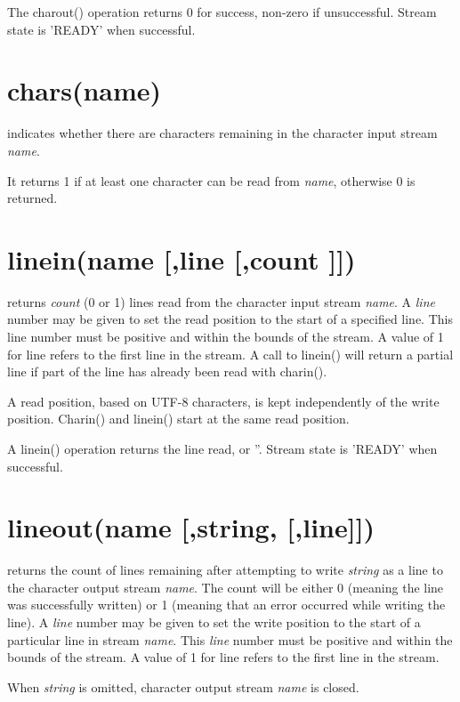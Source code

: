 The charout() operation returns 0 for success, non-zero if unsuccessful. Stream state is 'READY' when successful.

\section{chars(name)}
indicates whether there are characters remaining in the character input stream
\emph{name}.

It returns 1 if at least one character can be read from \emph{name},
otherwise 0 is returned.

\section{linein(name [,line [,count {]}{]})}
returns \emph{count} (0 or 1) lines read from the character input stream \emph{name}.
A \emph{line} number may be given to set the read position to the start of a specified line. This
line number must be positive and within the bounds of the stream. A value of 1 for line refers
to the first line in the stream. A call to linein() will return a partial line
if part of the line has already been read with charin().

A read position, based on UTF-8 characters, is kept independently of the write position.
Charin() and linein() start at the same read position.

A linein() operation returns the line read, or ''. Stream state is 'READY' when successful.


\section{lineout(name [,string, [,line{]}{]})}
returns the count of lines remaining after attempting to write \emph{string} as
a line to the character output stream \emph{name}. The count will be either 0
(meaning the line was successfully written) or 1 (meaning that an error
occurred while writing the line).
A \emph{line} number may be given to set the write position to the start of a
particular line in stream \emph{name}. This \emph{line} number must be positive and
within the bounds of the stream. A value of 1 for line
refers to the first line in the stream.

When \emph{string} is omitted, character output stream \emph{name} is closed.

